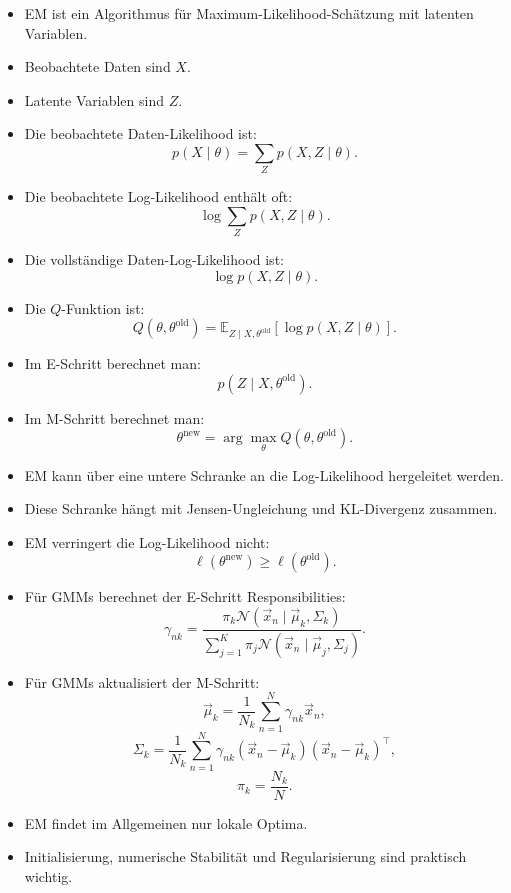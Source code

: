 \begin{itemize}
    \item EM ist ein Algorithmus für Maximum-Likelihood-Schätzung mit latenten Variablen.
    \item Beobachtete Daten sind \(X\).
    \item Latente Variablen sind \(Z\).
    \item Die beobachtete Daten-Likelihood ist:
    \[
        p(X\mid\theta)
        =
        \sum_Z
        p(X,Z\mid\theta).
    \]
    \item Die beobachtete Log-Likelihood enthält oft:
    \[
        \log
        \sum_Z
        p(X,Z\mid\theta).
    \]
    \item Die vollständige Daten-Log-Likelihood ist:
    \[
        \log p(X,Z\mid\theta).
    \]
    \item Die \(Q\)-Funktion ist:
    \[
        Q(\theta,\theta^{\mathrm{old}})
        =
        \mathbb{E}_{Z\mid X,\theta^{\mathrm{old}}}
        [
            \log p(X,Z\mid\theta)
        ].
    \]
    \item Im E-Schritt berechnet man:
    \[
        p(Z\mid X,\theta^{\mathrm{old}}).
    \]
    \item Im M-Schritt berechnet man:
    \[
        \theta^{\mathrm{new}}
        =
        \arg\max_{\theta}
        Q(\theta,\theta^{\mathrm{old}}).
    \]
    \item EM kann über eine untere Schranke an die Log-Likelihood hergeleitet werden.
    \item Diese Schranke hängt mit Jensen-Ungleichung und KL-Divergenz zusammen.
    \item EM verringert die Log-Likelihood nicht:
    \[
        \ell(\theta^{\mathrm{new}})
        \geq
        \ell(\theta^{\mathrm{old}}).
    \]
    \item Für GMMs berechnet der E-Schritt Responsibilities:
    \[
        \gamma_{nk}
        =
        \frac{
            \pi_k
            \mathcal{N}(\vec{x}_n\mid\vec{\mu}_k,\Sigma_k)
        }{
            \sum_{j=1}^{K}
            \pi_j
            \mathcal{N}(\vec{x}_n\mid\vec{\mu}_j,\Sigma_j)
        }.
    \]
    \item Für GMMs aktualisiert der M-Schritt:
    \[
        \vec{\mu}_k
        =
        \frac{1}{N_k}
        \sum_{n=1}^{N}
        \gamma_{nk}\vec{x}_n,
    \]
    \[
        \Sigma_k
        =
        \frac{1}{N_k}
        \sum_{n=1}^{N}
        \gamma_{nk}
        (\vec{x}_n-\vec{\mu}_k)
        (\vec{x}_n-\vec{\mu}_k)^{\top},
    \]
    \[
        \pi_k
        =
        \frac{N_k}{N}.
    \]
    \item EM findet im Allgemeinen nur lokale Optima.
    \item Initialisierung, numerische Stabilität und Regularisierung sind praktisch wichtig.
\end{itemize}


